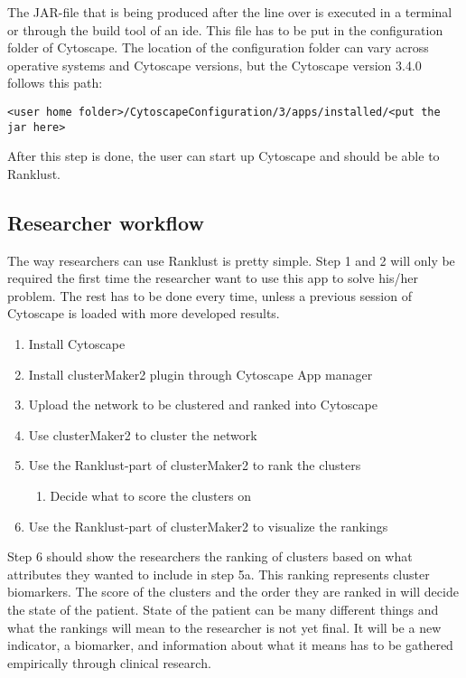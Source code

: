 The JAR-file that is being produced after the line over is executed in
a terminal or through the build tool of an \gls{ide}. This file has to be put in
the configuration folder of Cytoscape. The location of the configuration folder
can vary across operative systems and Cytoscape versions, but the Cytoscape
version 3.4.0 follows this path:
\begin{Verbatim}[fontsize=\scriptsize]
<user home folder>/CytoscapeConfiguration/3/apps/installed/<put the jar here>
\end{Verbatim}

After this step is done, the user can start up Cytoscape and should be able to
Ranklust.

\subsection{Researcher workflow}
The way researchers can use Ranklust is pretty simple. Step 1 and 2 will only be
required the first time the researcher want to use this app to solve his/her
problem. The rest has to be done every time, unless a previous session of
Cytoscape is loaded with more developed results.

\begin{enumerate}
    \item Install Cytoscape
    \item Install clusterMaker2 plugin through Cytoscape App manager
    \item Upload the network to be clustered and ranked into Cytoscape
    \item Use clusterMaker2 to cluster the network
    \item Use the Ranklust-part of clusterMaker2 to rank the clusters
        \begin{enumerate}
            \item Decide what to score the clusters on
        \end{enumerate}
    \item Use the Ranklust-part of clusterMaker2 to visualize the rankings
\end{enumerate}

Step 6 should show the researchers the ranking of clusters based on what
attributes they wanted to include in step 5a. This ranking represents cluster
biomarkers. The score of the clusters and the order they are ranked in will
decide the state of the patient. State of the patient can be many different
things and what the rankings will mean to the researcher is not yet final. It
will be a new indicator, a biomarker, and information about what it means has to
be gathered empirically through clinical research.

